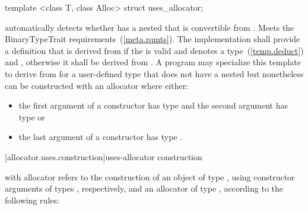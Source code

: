 %
\begin{itemdecl}
template <class T, class Alloc> struct uses_allocator;
\end{itemdecl}

\begin{itemdescr}
\pnum
\remarks automatically detects whether  has a nested  that
is convertible from . Meets the BinaryTypeTrait
requirements~(\ref{meta.rqmts}). The implementation shall provide a definition that is
derived from  if the  
is valid and denotes a type~(\ref{temp.deduct}) and
, otherwise it shall be
derived from . A program may specialize this template to derive from
 for a user-defined type  that does not have a nested
 but nonetheless can be constructed with an allocator where
either:

\begin{itemize}
\item the first argument of a constructor has type  and the
second argument has type  or

\item the last argument of a constructor has type .
\end{itemize}
\end{itemdescr}

[allocator.uses.construction]{uses-allocator construction}

\pnum
{} with allocator  refers to the
construction of an object  of type , using constructor arguments
 of types , respectively, and an allocator
 of type , according to the following rules:

